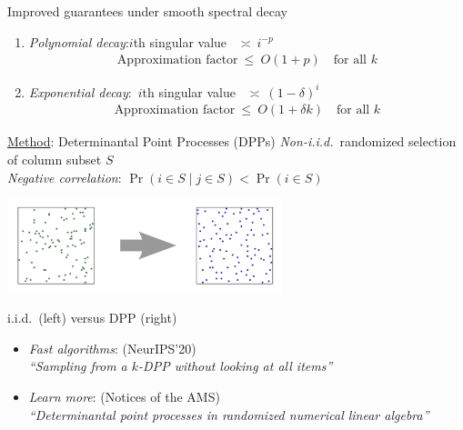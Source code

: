 \documentclass{beamer}
\begin{document}
\begin{frame}
\begin{columns}
\begin{column}{.32\textwidth}
\begin{block}{Improved guarantees under smooth spectral decay}
\begin{enumerate}
\item 
  \emph{Polynomial decay}:\quad $i$th singular
  value \ $\asymp\ i^{-p}$
  \vspace{-2mm}
  \begin{align*}
    \text{Approximation factor}\ \leq\ O(1+p)\quad\text{for all $k$}
  \end{align*}
  \vspace{0mm}
  
\item 
  \emph{Exponential decay}:\ $i$th singular
    value \ $\asymp\ (1-\delta)^i$
    \vspace{-2mm}
    \begin{align*}
    \text{Approximation factor}\ \leq\ O(1+\delta k)\quad\text{for all $k$}
    \end{align*}
\end{enumerate}
\end{block}

  \begin{block}{\underline{Method}: Determinantal Point Processes (DPPs)}
  \emph{Non-i.i.d.}~randomized selection of column subset $S$\\[2mm]

  \emph{Negative correlation}: $\Pr(i\in S\mid j\in S) < \Pr(i\in S)$
  \vspace{-2mm}
  
\begin{center}
  \includegraphics[width=0.6\textwidth]{../figs/gue.png}
  \vspace{-3mm}
  
  \small  i.i.d.~(left) versus DPP (right)%
\end{center}
\vspace{-2mm}
\begin{itemize}
\item \emph{Fast algorithms}: \cite{alpha-dpp} (NeurIPS'20)\\[-1mm]
  {\footnotesize\textit{``Sampling
      from a $k$-DPP without looking at all items''}}
  \item \emph{Learn more}: \cite{dpps-in-randnla}
    (Notices of the AMS)\\[-1mm]
    {\footnotesize\textit{``Determinantal point processes in randomized numerical
      linear algebra''}}
\end{itemize}
\end{block}



\end{column}
\end{columns}
\end{frame}
\end{document}
